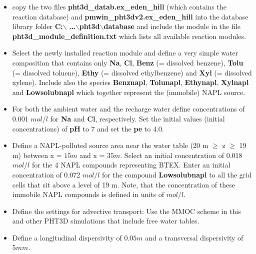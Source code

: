\begin{itemize}

\item copy the two files {\color{red} \textbf{pht3d\_datab.ex\_eden\_hill}} (which contains the reaction database) and
{\color{red} \textbf{pmwin\_pht3dv2.ex\_eden\_hill}} into  
the database library folder {\color{red} \textbf{C:$\backslash$ \ldots $\backslash$pht3d$\backslash$database}} and include
the module in the file {\color{red} \textbf{pht3d\_module\_definition.txt}}
which lists all available reaction modules. 

\item Select the newly installed reaction module and define
a very simple water composition that contains only {\color{red} \textbf{Na}}, 
{\color{red} \textbf{Cl}}, {\color{red} \textbf{Benz}} (= dissolved benzene), 
{\color{red} \textbf{Tolu}} (= dissolved toluene), {\color{red} \textbf{Ethy}} (= dissolved ethylbenzene) and {\color{red} \textbf{Xyl}} (= dissolved xylene).
Include also the species {\color{red} \textbf{Benznapl}}, {\color{red} \textbf{Tolunapl}}, {\color{red} \textbf{Ethynapl}}, {\color{red} \textbf{Xylnapl}} and {\color{red} \textbf{Lowsolubnapl}} which together represent the (immobile) NAPL source.  

\item For both the ambient water and the recharge water define concentrations 
of 0.001 $mol/l$ for {\color{red} \textbf{Na}} and {\color{red} \textbf{Cl}}, respectively. 
Set the initial values (initial concentrations) of {\color{red} \textbf{pH}} to 7 
and set the {\color{red} \textbf{pe}} to 4.0. 

\item Define a NAPL-polluted source area near the water table (20 m $\geq$ z $\geq$ 19 m) 
between x = $15 m$ and x = $35 m$. Select an initial concentration of
0.018 $mol/l$ for the 4 NAPL compounds representing BTEX. Enter an initial concentration
of 0.072 $mol/l$ for the compound {\color{red} \textbf{Lowsolubnapl}} to all the grid cells
that sit above a level of 19 m.
Note, that the concentration of these immobile NAPL compounds
is defined in units of $mol/l$.

\item Define the settings for advective transport: Use the MMOC scheme in this and other 
PHT3D simulations that include free water tables. 

\item Define a longitudinal dispersivity of $0.05m$ and a transversal 
dispersivity of $5mm$.


\end{itemize}
